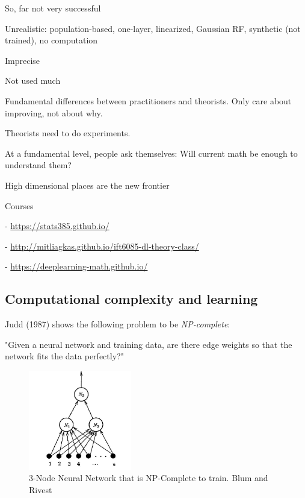 \documentclass[english]{article}
\begin{document}
\item So, far not very successful
\bitem
\item Unrealistic: population-based, one-layer, linearized, Gaussian RF, synthetic (not trained), no computation
\item Imprecise
\item Not used much
\eitem
\item  Fundamental differences between practitioners and theorists. Only care about improving, not about why. 

\item Theorists need to do experiments. 

\item At a fundamental level, people ask themselves: Will current math be enough to understand them?

High dimensional places are the new frontier

\item Courses

- \url{https://stats385.github.io/}

- \url{http://mitliagkas.github.io/ift6085-dl-theory-class/}

- \url{https://deeplearning-math.github.io/}



\eitem


\subsection{Computational complexity and learning}

\benum 
\item 
Judd (1987) shows the following
problem to be \emph{NP-complete}:


"Given a neural network and training data, are there edge weights so that the network fits the data perfectly?"

\begin{figure}
  \centering
  \includegraphics[width=0.4\textwidth]{br.png}
  \caption{3-Node Neural Network that is
NP-Complete to train. Blum and Rivest}
\end{figure}
\end{document}
